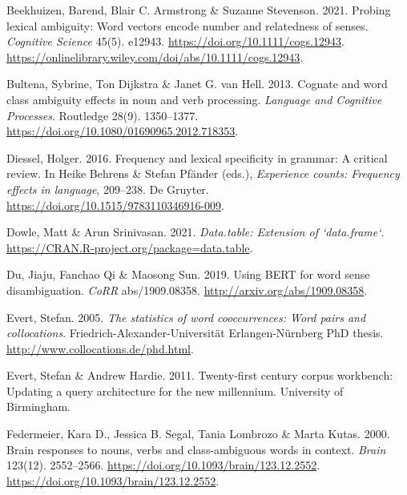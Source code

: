\documentclass[
]{article}
\newlength{\cslhangindent}
\newlength{\cslentryspacingunit} %
\newenvironment{CSLReferences}[2] %
 {%
  \setlength{\parindent}{0pt}
  \ifodd #1
  \let\oldpar\par
  \def\par{\hangindent=\cslhangindent\oldpar}
  \fi
  \setlength{\parskip}{#2\cslentryspacingunit}
 }%
 {}
\begin{document}
\hypertarget{refs}{}
\begin{CSLReferences}{1}{0}
\leavevmode{}%
Beekhuizen, Barend, Blair C. Armstrong \& Suzanne Stevenson. 2021.
Probing lexical ambiguity: Word vectors encode number and relatedness of
senses. \emph{Cognitive Science} 45(5). e12943.
\url{https://doi.org/10.1111/cogs.12943}.
\url{https://onlinelibrary.wiley.com/doi/abs/10.1111/cogs.12943}.

\leavevmode{}%
Bultena, Sybrine, Ton Dijkstra \& Janet G. van Hell. 2013. Cognate and
word class ambiguity effects in noun and verb processing. \emph{Language
and Cognitive Processes}. Routledge 28(9). 1350--1377.
\url{https://doi.org/10.1080/01690965.2012.718353}.

\leavevmode{}%
Diessel, Holger. 2016. Frequency and lexical specificity in grammar: A
critical review. In Heike Behrens \& Stefan Pfänder (eds.),
\emph{Experience counts: Frequency effects in language}, 209--238. De
Gruyter. \url{https://doi.org/10.1515/9783110346916-009}.

\leavevmode{}%
Dowle, Matt \& Arun Srinivasan. 2021. \emph{Data.table: Extension of
`data.frame`}. \url{https://CRAN.R-project.org/package=data.table}.

\leavevmode{}%
Du, Jiaju, Fanchao Qi \& Maosong Sun. 2019. Using {BERT} for word sense
disambiguation. \emph{CoRR} abs/1909.08358.
\url{http://arxiv.org/abs/1909.08358}.

\leavevmode{}%
Evert, Stefan. 2005. \emph{The statistics of word cooccurrences: Word
pairs and collocations}. Friedrich-Alexander-Universität
Erlangen-Nürnberg PhD thesis. \url{http://www.collocations.de/phd.html}.

\leavevmode{}%
Evert, Stefan \& Andrew Hardie. 2011. Twenty-first century corpus
workbench: Updating a query architecture for the new millennium.
University of Birmingham.

\leavevmode{}%
Federmeier, Kara D., Jessica B. Segal, Tania Lombrozo \& Marta Kutas.
2000. {Brain responses to nouns, verbs and class-ambiguous words in
context}. \emph{Brain} 123(12). 2552--2566.
\url{https://doi.org/10.1093/brain/123.12.2552}.
\url{https://doi.org/10.1093/brain/123.12.2552}.


\end{CSLReferences}
\end{document}
